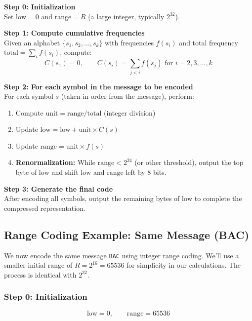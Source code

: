 \documentclass[12pt]{article}
\begin{document}
\begin{tcolorbox}[colback=blue!3,colframe=blue!40!black,title=Algorithm: Range Coding Encoding]
\textbf{Step 0: Initialization} \\
Set $\text{low} = 0$ and $\text{range} = R$ (a large integer, typically $2^{32}$).

\vspace{2mm}
\textbf{Step 1: Compute cumulative frequencies} \\
Given an alphabet $\{s_1, s_2, \dots, s_k\}$ with frequencies $f(s_i)$ and total frequency $\text{total} = \sum_i f(s_i)$, compute:
\[
C(s_1) = 0, \qquad C(s_i) = \sum_{j < i} f(s_j) \text{ for } i = 2, 3, \dots, k
\]

\vspace{2mm}
\textbf{Step 2: For each symbol in the message to be encoded} \\
For each symbol $s$ (taken in order from the message), perform:
\begin{enumerate}
    \item Compute $\text{unit} = \text{range} / \text{total}$ (integer division)
    \item Update $\text{low} = \text{low} + \text{unit} \times C(s)$
    \item Update $\text{range} = \text{unit} \times f(s)$
    \item \textbf{Renormalization:} While $\text{range} < 2^{24}$ (or other threshold), output the top byte of $\text{low}$ and shift $\text{low}$ and $\text{range}$ left by 8 bits.
\end{enumerate}

\vspace{2mm}
\textbf{Step 3: Generate the final code} \\
After encoding all symbols, output the remaining bytes of $\text{low}$ to complete the compressed representation.
\end{tcolorbox}

\subsection{Range Coding Example: Same Message (BAC)}

We now encode the same message \texttt{BAC} using integer range coding. We'll use a smaller initial range of $R = 2^{16} = 65536$ for simplicity in our calculations. The process is identical with $2^{32}$.

\subsubsection*{Step 0: Initialization}
\[
\text{low} = 0,\qquad \text{range} = 65536
\]
\end{document}
